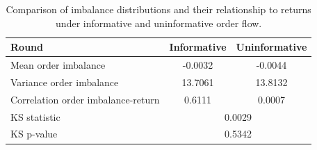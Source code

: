 
\begin{table}[ht]
\centering
\begin{tabular}{lcc}
\hline
\textbf{Round} & \textbf{Informative} & \textbf{Uninformative} \\
\hline
Mean order imbalance      & -0.0032 & -0.0044 \\
Variance order imbalance    & 13.7061 & 13.8132 \\
Correlation order imbalance-return & 0.6111 & 0.0007 \\
KS statistic          & \multicolumn{2}{c}{0.0029} \\
KS p-value            & \multicolumn{2}{c}{0.5342} \\
\hline
\end{tabular}
\caption{Comparison of imbalance distributions and their relationship to returns under informative and uninformative order flow.}
\label{tab:imbalance_comparison}
\end{table}

